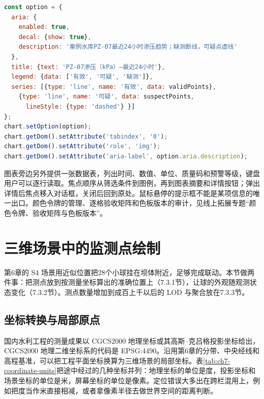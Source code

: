 \begin{lstlisting}[label={lst:ch07-aria-accessible},language=JavaScript,breaklines=true,caption={ECharts图表的无障碍与替代文本配置}]
const option = {
  aria: {
    enabled: true,
    decal: {show: true},
    description: '案例水库PZ-07最近24小时渗压趋势；缺测断线，可疑点虚线'
  },
  title: {text: 'PZ-07渗压（kPa）—最近24小时'},
  legend: {data: ['有效', '可疑', '缺测']},
  series: [{type: 'line', name: '有效', data: validPoints},
    {type: 'line', name: '可疑', data: suspectPoints,
      lineStyle: {type: 'dashed'} }]
};
chart.setOption(option);
chart.getDom().setAttribute('tabindex', '0');
chart.getDom().setAttribute('role', 'img');
chart.getDom().setAttribute('aria-label', option.aria.description);
\end{lstlisting}

图表旁边另外提供一张数据表，列出时间、数值、单位、质量码和预警等级，键盘用户可以逐行读取。焦点顺序从筛选条件到图例，再到图表摘要和详情按钮；弹出详情后焦点移入对话框，关闭后回到原处。鼠标悬停的提示框不能是某项信息的唯一出口。颜色令牌的管理、逐格验收矩阵和色板版本的审计，见线上拓展专题“颜色令牌、验收矩阵与色板版本”。

\section{三维场景中的监测点绘制}\label{sec:3d-monitoring-rendering}


第6章的 S4 场景用近似位置把28个小球挂在坝体附近，足够完成联动。本节做两件事：把测点放到按测量坐标算出的准确位置上（7.3.1节），让球的外观随观测状态变化（7.3.2节）。测点数量增加到成百上千以后的 LOD 与聚合放在7.3.3节。

\subsection{坐标转换与局部原点}

国内水利工程的测量成果以 CGCS2000 地理坐标或其高斯--克吕格投影坐标给出，CGCS2000 地理二维坐标系的代码是 EPSG:4490\cite{epsg4490}。沿用第6章的分带、中央经线和高程基准，可以把工程平面坐标换算为三维场景的局部坐标。表\ref{tab:ch7-coordinate-units}把途中经过的几种坐标并列：地理坐标的单位是度，投影坐标和场景坐标的单位是米，屏幕坐标的单位是像素。定位错误大多出在跨栏混用上，例如把度当作米直接相减，或者拿像素半径去做世界空间的距离判断。

